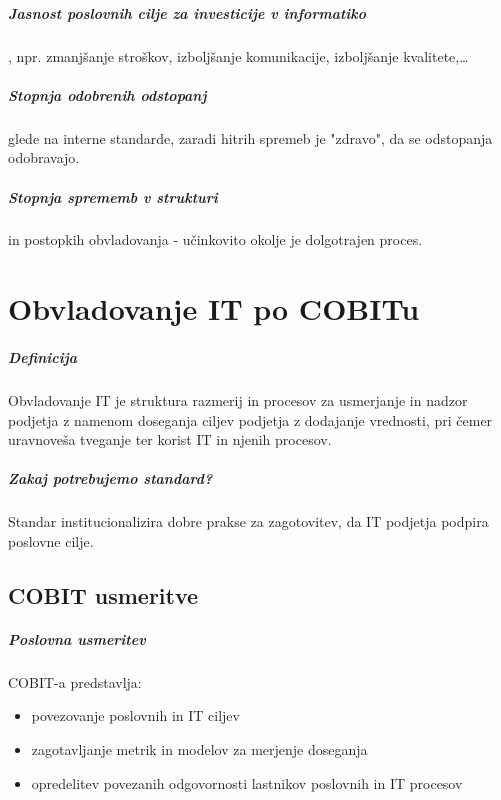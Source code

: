 \documentclass[a4paper,12pt]{report}
\begin{document}
\paragraph{Jasnost poslovnih cilje za investicije v informatiko}, npr. zmanjšanje stroškov, izboljšanje komunikacije, izboljšanje kvalitete,\dots

\paragraph{Stopnja odobrenih odstopanj} glede na interne standarde, zaradi hitrih spremeb je "zdravo", da se odstopanja odobravajo.

\paragraph{Stopnja sprememb v strukturi} in postopkih obvladovanja - učinkovito okolje je dolgotrajen proces.

\chapter{Obvladovanje IT po COBITu}

\paragraph{Definicija} Obvladovanje IT je struktura razmerij in procesov za usmerjanje in nadzor podjetja z namenom doseganja ciljev podjetja z dodajanje vrednosti, pri čemer uravnoveša tveganje ter korist IT in njenih procesov.

\paragraph{Zakaj potrebujemo standard?} Standar institucionalizira dobre prakse za zagotovitev, da IT podjetja podpira poslovne cilje.

\section{COBIT usmeritve}

\paragraph{Poslovna usmeritev} COBIT-a predstavlja:
\begin{itemize}
   \item povezovanje poslovnih in IT ciljev
   \item zagotavljanje metrik in modelov za merjenje doseganja
   \item opredelitev povezanih odgovornosti lastnikov poslovnih in IT procesov
\end{itemize}
\end{document}
